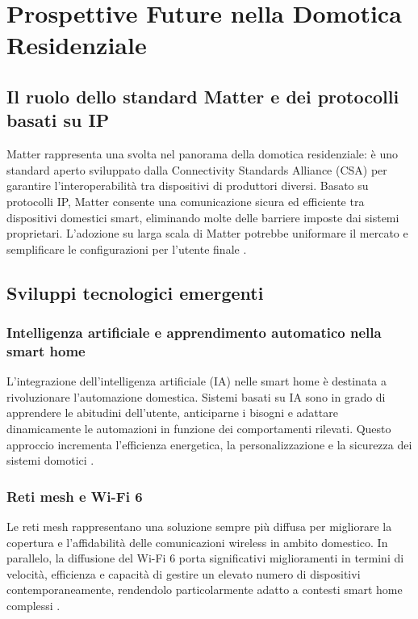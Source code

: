\chapter{Prospettive Future nella Domotica Residenziale}
\section{Il ruolo dello standard Matter e dei protocolli basati su IP}
Matter rappresenta una svolta nel panorama della domotica residenziale: è uno standard aperto sviluppato dalla Connectivity Standards Alliance (CSA) per garantire l’interoperabilità tra dispositivi di produttori diversi. Basato su protocolli IP, Matter consente una comunicazione sicura ed efficiente tra dispositivi domestici smart, eliminando molte delle barriere imposte dai sistemi proprietari. L’adozione su larga scala di Matter potrebbe uniformare il mercato e semplificare le configurazioni per l’utente finale \parencite{matterCSA}.

\section{Sviluppi tecnologici emergenti}

\subsection{Intelligenza artificiale e apprendimento automatico nella smart home}
L’integrazione dell’intelligenza artificiale (IA) nelle smart home è destinata a rivoluzionare l’automazione domestica. Sistemi basati su IA sono in grado di apprendere le abitudini dell’utente, anticiparne i bisogni e adattare dinamicamente le automazioni in funzione dei comportamenti rilevati. Questo approccio incrementa l’efficienza energetica, la personalizzazione e la sicurezza dei sistemi domotici \parencite{ieeeAI}.

\subsection{Reti mesh e Wi-Fi 6}
Le reti mesh rappresentano una soluzione sempre più diffusa per migliorare la copertura e l’affidabilità delle comunicazioni wireless in ambito domestico. In parallelo, la diffusione del Wi-Fi 6 porta significativi miglioramenti in termini di velocità, efficienza e capacità di gestire un elevato numero di dispositivi contemporaneamente, rendendolo particolarmente adatto a contesti smart home complessi \parencite{etsiWifi6}.

